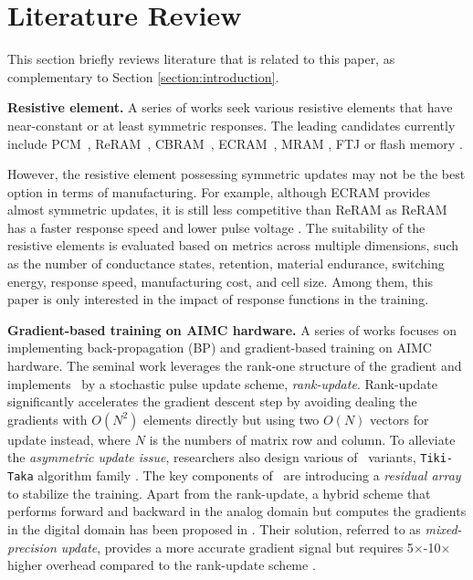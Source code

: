 \section{Literature Review}
\label{section:review}
This section briefly reviews literature that is related to this paper, as complementary to Section \ref{section:introduction}.

\textbf{Resistive element.}
A series of works seek various resistive elements that have near-constant or at least symmetric responses.
The leading candidates currently include {PCM}~\citep{Burr2016,2020legalloJPD}, {ReRAM}~\citep{Jang2014, Jang2015, stecconi2024analog}, 
{CBRAM}~\citep{Lim2018, Fuller2019}, {ECRAM}~\citep{tang2018ecram, onen2022nanosecond}, MRAM \citep{jung2022crossbar, xiao2024adapting}, FTJ \citep{guo2020ferroic} or flash memory \citep{wang2018three, xiang2020efficient, merrikh2017high}. 

However, the resistive element possessing symmetric updates may not be the best option in terms of manufacturing. 
For example, although ECRAM provides almost symmetric updates, it is still less competitive than ReRAM as ReRAM has a faster response speed and lower pulse voltage \citep{stecconi2024analog}.
The suitability of the resistive elements is evaluated based on metrics across multiple dimensions, such as the number of conductance states, retention, material endurance, switching energy, response speed, manufacturing cost, and cell size. 
Among them, this paper is only interested in the impact of response functions in the training.

\textbf{Gradient-based training on AIMC hardware.} A series of works focuses on implementing back-propagation (BP) and gradient-based training on AIMC hardware.
The seminal work \citep{gokmen2016acceleration, gokmen2017cnn} leverages the rank-one structure of the gradient and implements \AnalogSGD~by a stochastic pulse update scheme, \emph{rank-update}. Rank-update significantly accelerates the gradient descent step by avoiding dealing the gradients with $O(N^2)$ elements directly but using two $O(N)$ vectors for update instead, where $N$ is the numbers of matrix row and column.
To alleviate the {\em asymmetric update issue}, researchers also design various of \AnalogSGD~variants, \texttt{Tiki-Taka} algorithm family \citep{gokmen2020, gokmen2021, rasch2024fast}. The key components of \TT~are introducing a \emph{residual array} to stabilize the training.
Apart from the rank-update, a hybrid scheme that performs forward and backward in the analog domain but computes the gradients in the digital domain has been proposed in \citep{nandakumar2018, nandakumar2020}. Their solution, referred to as \emph{mixed-precision update}, provides a more accurate gradient signal but requires 5$\times$-10$\times$ higher overhead compared to the rank-update scheme \citep{rasch2024fast}.

